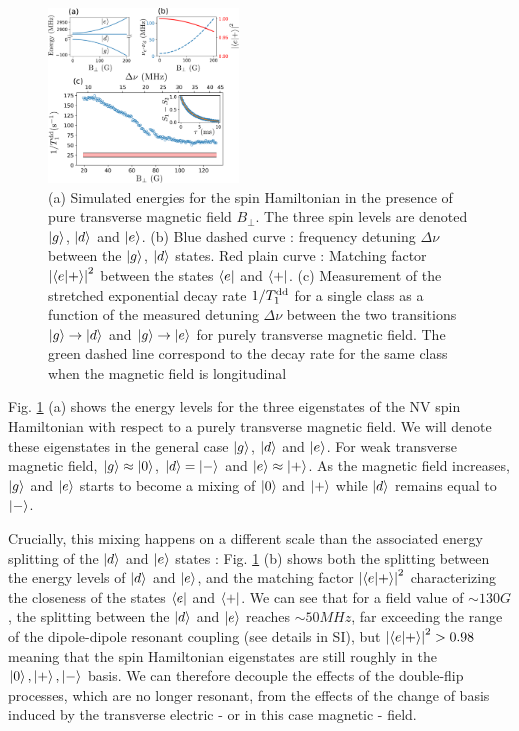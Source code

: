 \documentclass[preprintnumbers,amsmath,amssymb,superscriptaddress,twocolumn,showpacs]{revtex4-2}
\begin{document}
\begin{figure}
\includegraphics[width=0.45\textwidth]{Figures/fig transverse field V2}
\caption{(a) Simulated energies for the spin Hamiltonian in the presence of pure transverse magnetic field $B_\perp$. The three spin levels are denoted $\ket{g}$, $\ket{d}$ and $\ket{e}$. (b) Blue dashed curve : frequency detuning $\Delta \nu$ between the $\ket{g}$, $\ket{d}$ states. Red plain curve : Matching factor $\abs{\bra{e}\ket{+}}^2$ between the states $\bra{e}$ and $\bra{+}$. (c) Measurement of the stretched exponential decay rate $1/T_1^{\rm dd}$ for a single class as a function of the measured detuning $\Delta \nu$ between the two transitions $\ket{g} \to \ket {d}$ and  $\ket{g} \to \ket {e}$ for purely transverse magnetic field. The green dashed line correspond to the decay rate for the same class when the magnetic field is longitudinal}
\label{B_transverse}
\end{figure}

Fig. \ref{B_transverse} (a) shows the energy levels for the three eigenstates of the NV spin Hamiltonian with respect to a purely transverse magnetic field. We will denote these eigenstates in the general case $\ket{g}$, $\ket{d}$ and $\ket{e}$. For weak transverse magnetic field, $\ket{g} \approx \ket{0}$, $\ket{d}=\ket{-}$ and $\ket{e} \approx \ket{+}$. As the magnetic field increases, $\ket{g}$ and $\ket{e}$ starts to become a mixing of $\ket{0}$ and $\ket{+}$ while $\ket{d}$ remains equal to $\ket{-}$.

Crucially, this mixing happens on a different scale than the associated energy splitting of the $\ket{d}$ and $\ket{e}$ states : Fig. \ref{B_transverse} (b) shows both the splitting between the energy levels of $\ket{d}$ and $\ket{e}$, and the matching factor $\abs{\bra{e}\ket{+}}^2$ characterizing the closeness of the states $\bra{e}$ and $\bra{+}$. We can see that for a field value of $\sim 130 G$, the splitting between the $\ket{d}$ and $\ket{e}$ reaches $\sim 50 MHz$, far exceeding the range of the dipole-dipole resonant coupling (see details in SI), but $\abs{\bra{e}\ket{+}}^2 > 0.98$ meaning that the spin Hamiltonian eigenstates are still roughly in the $\ket{0}, \ket{+}, \ket{-}$ basis. We can therefore decouple the effects of the double-flip processes, which are no longer resonant, from the effects of the change of basis induced by the transverse electric - or in this case magnetic - field.
\end{document}
